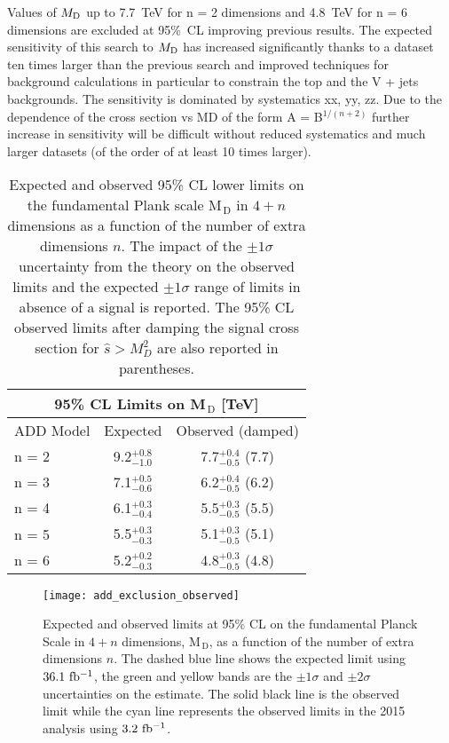 Values of $M_\mathrm{D}$ up to 7.7~TeV for n = 2 dimensions and 4.8~TeV for n = 6
dimensions are excluded at 95\%~CL improving previous results. The expected
sensitivity of this search to $M_\mathrm{D}$ has increased significantly thanks to a
dataset ten times larger than the previous search and improved techniques for
background calculations in particular to constrain the top and the V + jets
backgrounds. The sensitivity is dominated by systematics xx, yy, zz. Due to the
dependence of the cross section vs MD of the form A = B$^{1/(n+2)}$ further
increase in sensitivity will be difficult without reduced systematics and much
larger datasets (of the order of at least 10 times larger).
\begin{table}[!htb]
  \centering
  \begin{tabular}{lcc}
    \toprule
    \multicolumn{3}{c}{95\% CL Limits on M$_\mathrm{\, D}$
    [TeV]} \\
    \midrule \midrule
    ADD Model & Expected & Observed (damped) \\
    \midrule
    n = 2 & 9.2$^{+0.8}_{-1.0}$ & 7.7$^{+0.4}_{-0.5}$ (7.7) \B \\
    n = 3 & 7.1$^{+0.5}_{-0.6}$ & 6.2$^{+0.4}_{-0.5}$ (6.2) \T \B \\
    n = 4 & 6.1$^{+0.3}_{-0.4}$ & 5.5$^{+0.3}_{-0.5}$ (5.5) \T \B \\
    n = 5 & 5.5$^{+0.3}_{-0.3}$ & 5.1$^{+0.3}_{-0.5}$ (5.1) \T \B \\
    n = 6 & 5.2$^{+0.2}_{-0.3}$ & 4.8$^{+0.3}_{-0.5}$ (4.8) \T \\
    \bottomrule
  \end{tabular}
  \caption{Expected and observed 95\% CL lower limits on the fundamental Plank
      scale M$_\mathrm{\, D}$ in $4 + n$ dimensions as a function of the number
      of extra dimensions $n$. The impact of the $\pm 1 \sigma$ uncertainty from
      the theory on the observed limits and the expected $\pm 1 \sigma$ range of
      limits in absence of a signal is reported. The 95\% CL observed limits
      after damping the signal cross section for $\hat{s} > M_D^2$ are also
      reported in parentheses.}
  \label{tab:add_limits}
\end{table}
\begin{figure}[!htb]
  \centering
  \texttt{[image: add\_exclusion\_observed]}
  \caption{Expected and observed limits at 95\% CL on the fundamental Planck
    Scale in $4 + n$ dimensions, M$_\mathrm{\, D}$, as a function of the number
    of extra dimensions $n$. The dashed blue line shows the expected limit using
    $36.1~\mbox{fb$^{-1}$}$, the green and yellow bands are the $\pm 1 \sigma$ and
    $\pm 2 \sigma$ uncertainties on the estimate. The solid black line is the
    observed limit while the cyan line represents the observed limits in the
    2015 analysis using $3.2~\mbox{fb$^{-1}$}$.}
  \label{fig:add_observed}
\end{figure}
